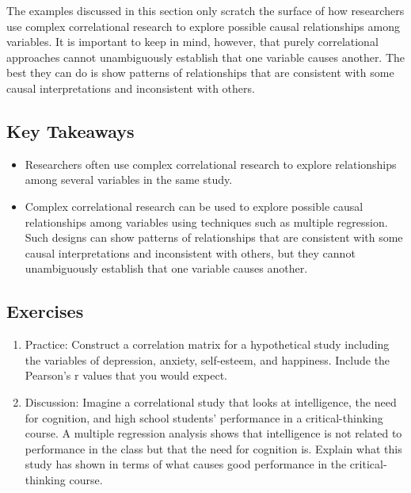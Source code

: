 The examples discussed in this section only scratch the surface of how researchers use complex correlational research to explore possible causal relationships among variables. It is important to keep in mind, however, that purely correlational approaches cannot unambiguously establish that one variable causes another. The best they can do is show patterns of relationships that are consistent with some causal interpretations and inconsistent with others.

\subsection{Key Takeaways}
\begin{fullwidth}
\begin{itemize}

\item Researchers often use complex correlational research to explore relationships among several variables in the same study.
\item Complex correlational research can be used to explore possible causal relationships among variables using techniques such as multiple regression. Such designs can show patterns of relationships that are consistent with some causal interpretations and inconsistent with others, but they cannot unambiguously establish that one variable causes another.
\end{itemize}
\end{fullwidth}

\subsection{Exercises}
\begin{fullwidth}
\begin{enumerate}
\item  Practice: Construct a correlation matrix for a hypothetical study including the variables of depression, anxiety, self-esteem, and happiness. Include the Pearson's r values that you would expect.
\item Discussion: Imagine a correlational study that looks at intelligence, the need for cognition, and high school students' performance in a critical-thinking course. A multiple regression analysis shows that intelligence is not related to performance in the class but that the need for cognition is. Explain what this study has shown in terms of what causes good performance in the critical- thinking course.
\end{enumerate}
\end{fullwidth}
